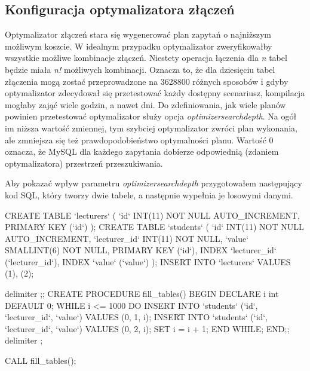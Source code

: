 \subsection{Konfiguracja optymalizatora złączeń}
Optymalizator złączeń stara się wygenerować plan zapytań o najniższym możliwym koszcie. W idealnym przypadku optymalizator zweryfikowałby wszystkie możliwe kombinacje złączeń. Niestety operacja łączenia dla \textit{n} tabel będzie miała \textit{n!} możliwych kombinacji. Oznacza to, że dla dziesięciu tabel złączenia mogą zostać przeprowadzone na 3628800 różnych sposobów i gdyby optymalizator zdecydował się przetestować każdy dostępny scenariusz, kompilacja mogłaby zająć wiele godzin, a nawet dni. Do zdefiniowania, jak wiele planów powinien przetestować optymalizator służy opcja \textit{optimizer\textunderscore search\textunderscore depth}. Na ogół im niższa wartość zmiennej, tym szybciej optymalizator zwróci plan wykonania, ale zmniejsza się też prawdopodobieństwo optymalności planu. Wartość 0 oznacza, że MySQL dla każdego zapytania dobierze odpowiednią (zdaniem optymalizatora) przestrzeń przeszukiwania.

Aby pokazać wpływ parametru \textit{optimizer\textunderscore search\textunderscore depth} przygotowałem następujący kod SQL, który tworzy dwie tabele, a następnie wypełnia je losowymi danymi.

\begin{spverbatim}
	CREATE TABLE `lecturers`
	(
	`id` INT(11) NOT NULL AUTO_INCREMENT,
	PRIMARY KEY (`id`)
	);
	CREATE TABLE `students`
	(
	`id` INT(11) NOT NULL AUTO_INCREMENT,
	`lecturer_id` INT(11) NOT NULL,
	`value` SMALLINT(6) NOT NULL,
	PRIMARY KEY (`id`),
	INDEX `lecturer_id` (`lecturer_id`),
	INDEX `value` (`value`)
	);
	INSERT INTO `lecturers` VALUES (1), (2);
	
	delimiter ;;
	CREATE PROCEDURE fill_tables()
	BEGIN
		DECLARE i int DEFAULT 0;
		WHILE i <= 1000 DO
			INSERT INTO `students` (`id`, `lecturer_id`, `value`) VALUES (0, 1, i);
			INSERT INTO `students` (`id`, `lecturer_id`, `value`) VALUES (0, 2, i);
			SET i = i + 1;
		END WHILE;
	END;;
	delimiter ;
	
	CALL fill_tables();
\end{spverbatim}

